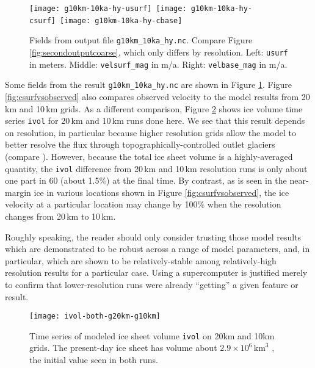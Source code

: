 \begin{figure}[ht]
\centering
\mbox{\texttt{[image: g10km-10ka-hy-usurf]} \texttt{[image: g10km-10ka-hy-csurf]} \texttt{[image: g10km-10ka-hy-cbase]}}
\caption{Fields from output file \texttt{g10km_10ka_hy.nc}.  Compare Figure \ref{fig:secondoutputcoarse}, which only differs by resolution.  Left: \texttt{usurf} in meters.  Middle: \texttt{velsurf_mag} in m/a.  Right: \texttt{velbase_mag} in m/a.}
\label{fig:secondoutputfiner}
\end{figure}

Some fields from the result \verb|g10km_10ka_hy.nc| are shown in Figure \ref{fig:secondoutputfiner}.  Figure \ref{fig:csurfvsobserved} also compares observed velocity to the model results from 20\,km and 10\,km grids.  As a different comparison, Figure \ref{fig:ivolboth} shows ice volume time series \texttt{ivol} for 20\,km and 10\,km runs done here.  We see that this result depends on resolution, in particular because higher resolution grids allow the model to better resolve the flux through topographically-controlled outlet glaciers (compare \cite{Pfefferetal2008}).  However, because the total ice sheet volume is a highly-averaged quantity, the \texttt{ivol} difference from 20\,km and 10\,km resolution runs is only about one part in 60 (about 1.5\%) at the final time.  By contrast, as is seen in the near-margin ice in various locations shown in Figure \ref{fig:csurfvsobserved}, the ice velocity at a particular location may change by 100\% when the resolution changes from 20\,km to 10\,km.

Roughly speaking, the reader should only consider trusting those model results which are demonstrated to be robust across a range of model parameters, and, in particular, which are shown to be relatively-stable among relatively-high resolution results for a particular case.  Using a supercomputer is justified merely to confirm that lower-resolution runs were already ``getting'' a given feature or result.

\begin{figure}[ht]
\centering
\texttt{[image: ivol-both-g20km-g10km]}
\caption{Time series of modeled ice sheet volume \texttt{ivol} on 20km and 10km grids.  The present-day ice sheet has volume about $2.9\times 10^6\,\text{km}^3$ \cite{BamberLayberryGogenini}, the initial value seen in both runs.}
\label{fig:ivolboth}
\end{figure}


